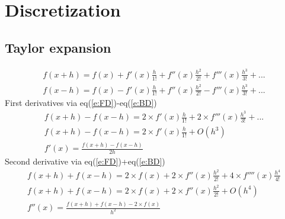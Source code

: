 \documentclass[11pt,dvips]{article}
\numberwithin{equation}{section}
\begin{document}
\section{Discretization}
\subsection{Taylor expansion}
%
\begin{gather}
f(x+h)=f(x)+f'(x)\frac{h}{1!}+f''(x)\frac{h^2}{2!}+f'''(x)\frac{h^3}{3!}+...  \label{e:FD} \\
f(x-h)=f(x)-f'(x)\frac{h}{1!}+f''(x)\frac{h^2}{2!}-f'''(x)\frac{h^3}{3!}+...  \label{e:BD} 
\end{gather}
%
First derivatives via eq(\ref{e:FD})-eq(\ref{e:BD})
%
\begin{gather}
f(x+h)-f(x-h)=2\times f'(x)\frac{h}{1!}+2 \times f'''(x)\frac{h^3}{3!}+... \nonumber \\
f(x+h)-f(x-h)=2\times f'(x)\frac{h}{1!}+O(h^3) \nonumber \\
f'(x)=\frac{f(x+h)-f(x-h)}{2h}  \label{e:f_1d}
\end{gather}
%
Second derivative via eq(\ref{e:FD})+eq(\ref{e:BD})
%
\begin{gather}
f(x+h)+f(x-h)=2\times f(x)+2 \times f''(x)\frac{h^2}{2!}+4 \times f''''(x)
\frac{h^4}{4!} \nonumber \\
f(x+h)+f(x-h)=2\times f(x)+2 \times f''(x)\frac{h^2}{2!}+O(h^4) \nonumber \\
f''(x)=\frac{f(x+h)+f(x-h)-2\times f(x)}{h^2} \label{e:f_2d}
\end{gather}
%
\end{document}
